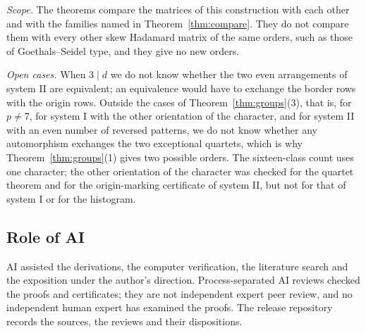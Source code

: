 \documentclass[11pt]{article}
\theoremstyle{plain}
\theoremstyle{definition}
\theoremstyle{remark}
\begin{document}
\emph{Scope.} The theorems compare the matrices of this construction with
each other and with the families named in Theorem~\ref{thm:compare}. They do
not compare them with every other skew Hadamard matrix of the same orders,
such as those of Goethals--Seidel type, and they give no new orders.

\emph{Open cases.} When $3\mid d$ we do not know whether the two even
arrangements of system II are equivalent; an equivalence would have to
exchange the border rows with the origin rows. Outside the cases of
Theorem~\ref{thm:groups}(3), that is, for $p\ne7$, for system I with the
other orientation of the character, and for system II with an even number of
reversed patterns, we do not know whether any automorphism exchanges the two
exceptional quartets, which is why Theorem~\ref{thm:groups}(1) gives two
possible orders. The sixteen-class
count uses one character; the other orientation of the character was checked
for the quartet theorem and for the origin-marking certificate of system II,
but not for that of system I or for the histogram.

\subsection*{Role of AI}
AI assisted the derivations, the computer verification, the literature
search and the exposition under the author's direction. Process-separated AI
reviews checked the proofs and certificates; they are not independent expert
peer review, and no independent human expert has examined the proofs. The
release repository records the sources, the reviews and their dispositions.
\end{document}

